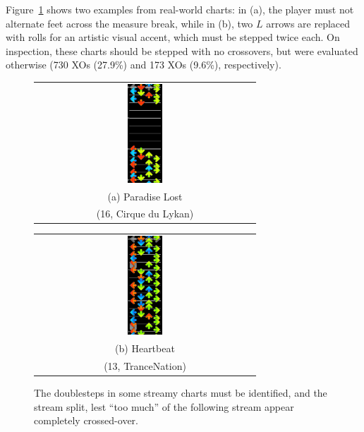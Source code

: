 \documentclass[10pt]{sigplanconf}
\begin{document}
Figure~\ref{fig:force-doublestep} shows two examples from real-world charts:
in (a), the player must not alternate feet across the measure break,
while in (b), two $L$ arrows are replaced with rolls for an artistic visual accent, which must be stepped twice each.
On inspection, these charts should be stepped with no crossovers, but were evaluated otherwise %
(730 XOs (27.9\%) and 173 XOs (9.6\%), respectively).

\begin{figure}[t]
	\begin{center}
	\begin{tabular}{c}
		\includegraphics[width=0.16\textwidth]{paradise-lost-false-positive.png}
		\\
		(a) Paradise Lost \\
		(16, Cirque du Lykan)
	\end{tabular}
	\begin{tabular}{c}
		\includegraphics[width=0.16\textwidth]{hearbeat-rollstream-doublestep.png}
		\\
		(b) Heartbeat \\
		(13, TranceNation)
	\end{tabular}
	\end{center}
	\caption{The doublesteps in some streamy charts must be identified, and the stream split, lest ``too much'' of the following stream appear completely crossed-over.}
	\label{fig:force-doublestep}
\end{figure}
\end{document}
